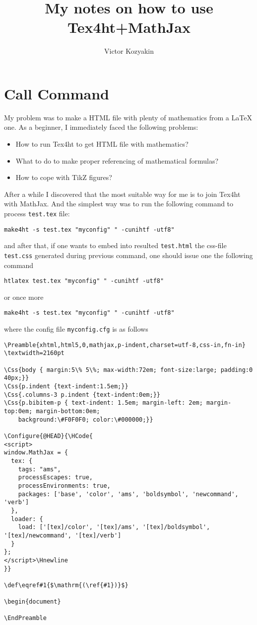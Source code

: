 \documentclass{article}
\title{My notes on how to use Tex4ht+MathJax}
\author{Victor Kozyakin}
\begin{document}
\maketitle

\section{Call Command}\label{S1}
My problem was to make a HTML file with plenty of mathematics from a \LaTeX{}
one. As a beginner, I immediately faced the following problems:
\begin{itemize}
\item How to run Tex4ht to get HTML file with mathematics?
\item What to do to make proper referencing of mathematical formulas?
\item How to cope with TikZ figures?
\end{itemize}

After a while I discovered that the most suitable way for me is to join
Tex4ht with MathJax. And the simplest way was to run the following command to
process \verb|test.tex| file:

{\small
\begin{verbatim}
make4ht -s test.tex "myconfig" " -cunihtf -utf8"
\end{verbatim}}
\noindent and after that, if one wants to embed into resulted
\verb|test.html| the css-file \verb|test.css| generated during previous
command, one should issue one the following command {\small
\begin{verbatim}
htlatex test.tex "myconfig" " -cunihtf -utf8"
\end{verbatim}
\noindent or once more
\begin{verbatim}
make4ht -s test.tex "myconfig" " -cunihtf -utf8"
\end{verbatim}}
\noindent where the config file \verb|myconfig.cfg| is as
follows

{\small
\begin{verbatim}
\Preamble{xhtml,html5,0,mathjax,p-indent,charset=utf-8,css-in,fn-in}
\textwidth=2160pt

\Css{body { margin:5\% 5\%; max-width:72em; font-size:large; padding:0 40px;}}
\Css{p.indent {text-indent:1.5em;}}
\Css{.columns-3 p.indent {text-indent:0em;}}
\Css{p.bibitem-p { text-indent: 1.5em; margin-left: 2em; margin-top:0em; margin-bottom:0em;
    background:\#F0F0F0; color:\#000000;}}

\Configure{@HEAD}{\HCode{
<script>
window.MathJax = {
  tex: {
    tags: "ams",
    processEscapes: true,
    processEnvironments: true,
    packages: ['base', 'color', 'ams', 'boldsymbol', 'newcommand', 'verb']
  },
  loader: {
    load: ['[tex]/color', '[tex]/ams', '[tex]/boldsymbol', '[tex]/newcommand', '[tex]/verb']
  }
};
</script>\Hnewline
}}

\def\eqref#1{$\mathrm{(\ref{#1})}$}

\begin{document}

\EndPreamble
\end{verbatim}}
\end{document}

